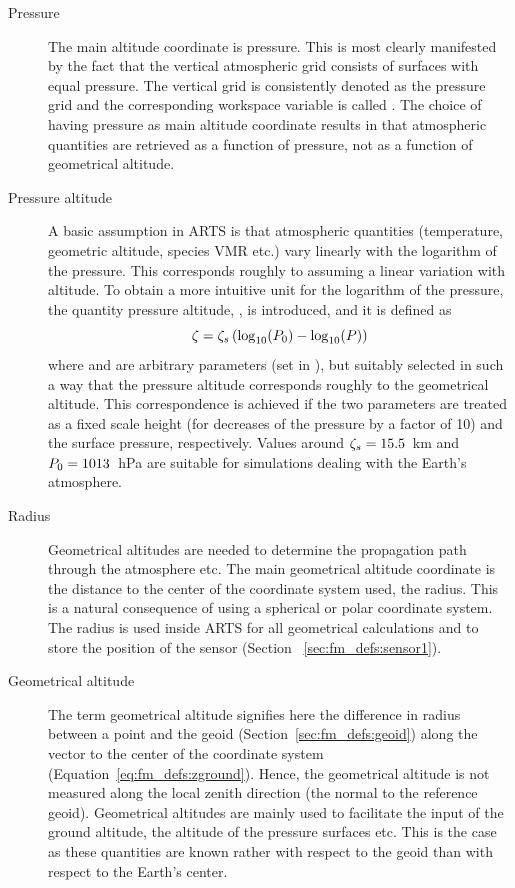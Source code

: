 \begin{description}
  
\item[Pressure] The main altitude coordinate is
  pressure. This is most clearly manifested by the fact that the
  vertical atmospheric grid consists of surfaces with equal pressure.
  The vertical grid is consistently denoted as the pressure grid and
  the corresponding workspace variable is called . The
  choice of having pressure as main altitude coordinate results in
  that atmospheric quantities are retrieved as a function of pressure,
  not as a function of geometrical altitude.
  
\item[Pressure altitude] A basic assumption
  in ARTS is that atmospheric quantities (temperature, geometric
  altitude, species VMR etc.) vary linearly with the logarithm of the
  pressure. This corresponds roughly to assuming a linear variation
  with altitude. To obtain a more intuitive unit for the logarithm of
  the pressure, the quantity pressure altitude, \PrsAlt, is
  introduced, and it is defined as
  \begin{equation}
   \zeta = \zeta_{s}\left( \log_{10}(P_{0}) - \log_{10}(P) \right)
   \label{eq:fm_defs:prsalt}
  \end{equation}
  where  and  are arbitrary parameters (set in
  ), but suitably selected in such a way that the pressure
  altitude corresponds roughly to the geometrical altitude.  This
  correspondence is achieved if the two parameters are treated as a
  fixed scale height (for decreases of the pressure by a factor of
  10) and the surface pressure, respectively. Values around
  $\zeta_{s}=15.5$~km and $P_{0}=1013$~hPa are suitable for
  simulations dealing with the Earth's atmosphere.
  
\item[Radius] Geometrical altitudes are
  needed to determine the propagation path through the atmosphere etc.
  The main geometrical altitude coordinate is the distance to the
  center of the coordinate system used, the radius. This is a natural
  consequence of using a spherical or polar coordinate system. The
  radius is used inside ARTS for all geometrical calculations and to
  store the position of the sensor (Section~
  \ref{sec:fm_defs:sensor1}).
  
\item[Geometrical altitude] The term
  geometrical altitude signifies here the difference in radius between
  a point and the geoid (Section~\ref{sec:fm_defs:geoid}) along the
  vector to the center of the coordinate system
  (Equation~\ref{eq:fm_defs:zground}). Hence, the geometrical altitude
  is not measured along the local zenith direction (the normal to the
  reference geoid). Geometrical altitudes are mainly used to
  facilitate the input of the ground altitude, the altitude of the
  pressure surfaces etc. This is the case as these quantities are known
  rather with respect to the geoid than with respect to the Earth's
  center.

\end{description}


